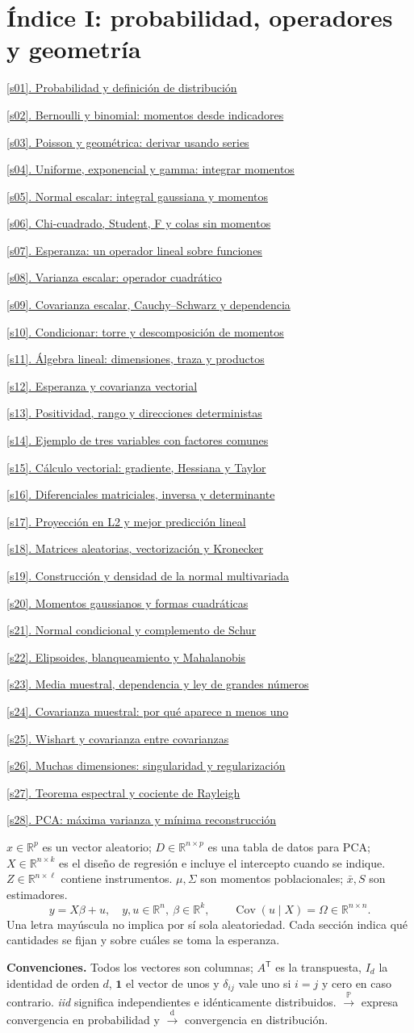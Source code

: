 \documentclass[11pt,a4paper]{article}
\newcommand{\R}{\mathbb R}
\newcommand{\Prob}{\mathbb P}
\newcommand{\T}{^{\mathsf T}}
\newcommand{\ones}{\mathbf 1}
\DeclareMathOperator{\Cov}{Cov}
\newcommand{\pto}{\xrightarrow{\Prob}}
\newcommand{\dto}{\xrightarrow{\mathrm d}}
\newcommand{\ruta}[2]{\hyperref[#1]{\ref{#1}. #2}\dotfill\pageref{#1}\par}
\theoremstyle{definition}\newtheorem{definicion}[teorema]{Definición}
\begin{document}
\section*{Índice I: probabilidad, operadores y geometría}
\small
\ruta{s01}{Probabilidad y definición de distribución}
\ruta{s02}{Bernoulli y binomial: momentos desde indicadores}
\ruta{s03}{Poisson y geométrica: derivar usando series}
\ruta{s04}{Uniforme, exponencial y gamma: integrar momentos}
\ruta{s05}{Normal escalar: integral gaussiana y momentos}
\ruta{s06}{Chi-cuadrado, Student, F y colas sin momentos}
\ruta{s07}{Esperanza: un operador lineal sobre funciones}
\ruta{s08}{Varianza escalar: operador cuadrático}
\ruta{s09}{Covarianza escalar, Cauchy--Schwarz y dependencia}
\ruta{s10}{Condicionar: torre y descomposición de momentos}
\ruta{s11}{Álgebra lineal: dimensiones, traza y productos}
\ruta{s12}{Esperanza y covarianza vectorial}
\ruta{s13}{Positividad, rango y direcciones deterministas}
\ruta{s14}{Ejemplo de tres variables con factores comunes}
\ruta{s15}{Cálculo vectorial: gradiente, Hessiana y Taylor}
\ruta{s16}{Diferenciales matriciales, inversa y determinante}
\ruta{s17}{Proyección en L2 y mejor predicción lineal}
\ruta{s18}{Matrices aleatorias, vectorización y Kronecker}
\ruta{s19}{Construcción y densidad de la normal multivariada}
\ruta{s20}{Momentos gaussianos y formas cuadráticas}
\ruta{s21}{Normal condicional y complemento de Schur}
\ruta{s22}{Elipsoides, blanqueamiento y Mahalanobis}
\ruta{s23}{Media muestral, dependencia y ley de grandes números}
\ruta{s24}{Covarianza muestral: por qué aparece n menos uno}
\ruta{s25}{Wishart y covarianza entre covarianzas}
\ruta{s26}{Muchas dimensiones: singularidad y regularización}
\ruta{s27}{Teorema espectral y cociente de Rayleigh}
\ruta{s28}{PCA: máxima varianza y mínima reconstrucción}
\normalsize
\begin{idea}
$x\in\R^p$ es un vector aleatorio; $D\in\R^{n\times p}$ es una tabla de datos
para PCA; $X\in\R^{n\times k}$ es el diseño de regresión e incluye el
intercepto cuando se indique. $Z\in\R^{n\times\ell}$ contiene instrumentos.
$\mu,\Sigma$ son momentos poblacionales; $\bar x,S$ son estimadores.
\[
y=X\beta+u,\quad
y,u\in\R^n,\ \beta\in\R^k,\qquad
\Cov(u\mid X)=\Omega\in\R^{n\times n}.
\]
Una letra mayúscula no implica por sí sola aleatoriedad. Cada sección indica
qué cantidades se fijan y sobre cuáles se toma la esperanza.
\end{idea}
\textbf{Convenciones.} Todos los vectores son columnas; $A\T$ es la transpuesta,
$I_d$ la identidad de orden $d$, $\ones$ el vector de unos y $\delta_{ij}$ vale
uno si $i=j$ y cero en caso contrario. \emph{iid} significa independientes e
idénticamente distribuidos. $\pto$ expresa convergencia en probabilidad y
$\dto$ convergencia en distribución.
\clearpage
\end{document}
